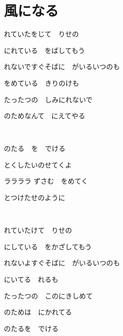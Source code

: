 \section{風になる}

れていたをじて　りせの

にれている　をばしてもう

れないですぐそばに　がいるいつのも

をめている　きりのけも

たったつの　しみにれないで

のためなんて　にえてやる

~

のたる　を　でける

とくしたいのせてくよ

ララララ ずさむ　をめてく

とつけたせのように

~

れていたけて　りせの

にしている　をかざしてもう

れないよすぐそばに　がいるいつのも

にいてる　れるも

たったつの　このにきしめて

のためは　にかれてる

のたるを　でける

